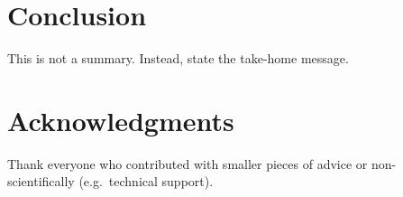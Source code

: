  \section{Conclusion}
 This is not a summary. Instead, state the take-home message.


\section*{Acknowledgments}
Thank everyone who contributed with smaller pieces of advice or non-scientifically (e.g.\ technical support).
